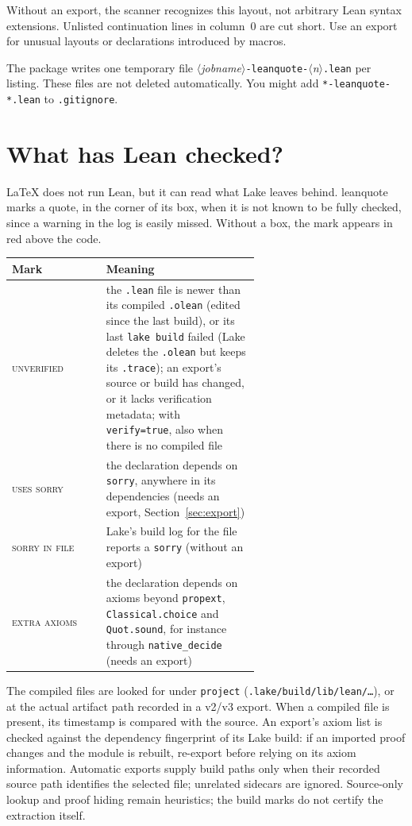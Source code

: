 \documentclass[11pt]{article}
\newcommand{\meta}[1]{\ensuremath{\langle}\textit{#1}\ensuremath{\rangle}}
\newcommand{\opt}[1]{\texttt{#1}}
\begin{document}
Without an export, the scanner recognizes this layout, not arbitrary Lean syntax extensions.
Unlisted continuation lines in column~0 are cut short. Use an export for unusual layouts
or declarations introduced by macros.

The package writes one temporary file
\meta{jobname}\texttt{-leanquote-}\meta{n}\texttt{.lean} per listing.
These files are not deleted automatically. You might add \verb|*-leanquote-*.lean|
to \texttt{.gitignore}.

\section{What has Lean checked?}\label{sec:compiled}

\LaTeX{} does not run Lean, but it can read what Lake leaves behind. \textsf{leanquote} marks a
quote, in the corner of its box, when it is not known to be fully checked, since a warning in the
log is easily missed. Without a box, the mark appears in red above the code.

\begin{center}
\begin{tabular}{@{}lp{0.62\linewidth}@{}}
\toprule
Mark & Meaning \\
\midrule
\textsc{unverified} & the \texttt{.lean} file is newer than its compiled \texttt{.olean} (edited
  since the last build), or its last \texttt{lake build} failed (Lake deletes the \texttt{.olean}
  but keeps its \texttt{.trace}); an export's source or build has changed, or it lacks
  verification metadata; with \opt{verify=true}, also when there is no compiled file \\
\textsc{uses sorry} & the declaration depends on \texttt{sorry}, anywhere in its dependencies
  (needs an export, Section~\ref{sec:export}) \\
\textsc{sorry in file} & Lake's build log for the file reports a \texttt{sorry} (without an
  export) \\
\textsc{extra axioms} & the declaration depends on axioms beyond \texttt{propext},
  \texttt{Classical.choice} and \texttt{Quot.sound}, for instance through \texttt{native\_decide}
  (needs an export) \\
\bottomrule
\end{tabular}
\end{center}

\noindent The compiled files are looked for under \opt{project}
(\texttt{.lake/build/lib/lean/\dots}), or at the actual artifact path recorded in a v2/v3 export.
When a compiled file is present, its timestamp is compared with the source. An export's
axiom list is checked against the dependency fingerprint of its Lake build: if an imported
proof changes and the module is rebuilt, re-export before relying on its axiom information.
Automatic exports supply build paths only when their recorded source path identifies the
selected file; unrelated sidecars are ignored.
Source-only lookup and proof hiding remain heuristics; the build marks do not certify the
extraction itself.
\end{document}
